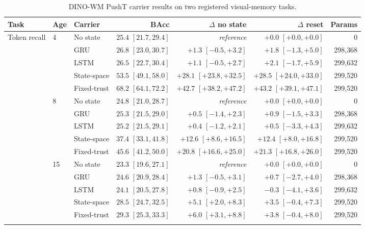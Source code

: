 \begin{table}[H]
\centering
\scriptsize
\setlength{\tabcolsep}{4pt}
\renewcommand{\arraystretch}{1.10}
\caption{DINO-WM PushT carrier results on two registered visual-memory tasks.}
\label{tab:appendix-dinowm-pusht}
\begin{tabular}{lllrrrr}
\toprule
Task & Age & Carrier & BAcc & $\Delta$ no state & $\Delta$ reset & Params \\
\midrule
Token recall & 4 & No state & $25.4$ $[21.7,29.4]$ & \textit{reference} & $+0.0$ $[+0.0,+0.0]$ & 0 \\
 &  & GRU & $26.8$ $[23.0,30.7]$ & $+1.3$ $[-0.5,+3.2]$ & $+1.8$ $[-1.3,+5.0]$ & 298{,}368 \\
 &  & LSTM & $26.5$ $[22.7,30.4]$ & $+1.1$ $[-0.5,+2.7]$ & $+2.1$ $[-1.7,+5.9]$ & 299{,}632 \\
 &  & State-space & $53.5$ $[49.1,58.0]$ & $+28.1$ $[+23.8,+32.5]$ & $+28.5$ $[+24.0,+33.0]$ & 299{,}520 \\
 &  & Fixed-trust & $68.2$ $[64.1,72.2]$ & $+42.7$ $[+38.2,+47.2]$ & $+43.2$ $[+39.1,+47.1]$ & 299{,}520 \\
\addlinespace[1pt]
 & 8 & No state & $24.8$ $[21.0,28.7]$ & \textit{reference} & $+0.0$ $[+0.0,+0.0]$ & 0 \\
 &  & GRU & $25.3$ $[21.5,29.0]$ & $+0.5$ $[-1.4,+2.3]$ & $+0.9$ $[-1.5,+3.3]$ & 298{,}368 \\
 &  & LSTM & $25.2$ $[21.5,29.1]$ & $+0.4$ $[-1.2,+2.1]$ & $+0.5$ $[-3.3,+4.3]$ & 299{,}632 \\
 &  & State-space & $37.4$ $[33.1,41.8]$ & $+12.6$ $[+8.6,+16.5]$ & $+12.4$ $[+8.0,+16.8]$ & 299{,}520 \\
 &  & Fixed-trust & $45.6$ $[41.2,50.0]$ & $+20.8$ $[+16.6,+25.0]$ & $+21.3$ $[+16.8,+26.0]$ & 299{,}520 \\
\addlinespace[1pt]
 & 15 & No state & $23.3$ $[19.6,27.1]$ & \textit{reference} & $+0.0$ $[+0.0,+0.0]$ & 0 \\
 &  & GRU & $24.6$ $[20.9,28.4]$ & $+1.3$ $[-0.5,+3.1]$ & $+0.7$ $[-2.7,+4.0]$ & 298{,}368 \\
 &  & LSTM & $24.1$ $[20.5,27.8]$ & $+0.8$ $[-0.9,+2.5]$ & $-0.3$ $[-4.1,+3.6]$ & 299{,}632 \\
 &  & State-space & $28.5$ $[24.7,32.5]$ & $+5.1$ $[+2.0,+8.3]$ & $+3.5$ $[-0.4,+7.3]$ & 299{,}520 \\
 &  & Fixed-trust & $29.3$ $[25.3,33.3]$ & $+6.0$ $[+3.1,+8.8]$ & $+3.8$ $[-0.4,+8.0]$ & 299{,}520 \\
\midrule
\addlinespace[1pt]

\end{tabular}
\end{table}
